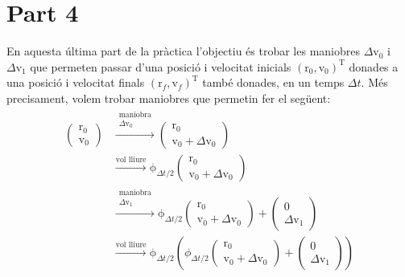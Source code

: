 \documentclass[10pt,a4paper]{article}
\newcommand{\vf}[1]{\boldsymbol{\mathrm{#1}}} %
\theoremstyle{definition}
\theoremstyle{remark}
\begin{document}
\section*{Part 4}
En aquesta última part de la pràctica l'objectiu és trobar les maniobres $\Delta \vf{v}_0$ i $\Delta \vf{v}_1$ que permeten passar d'una posició i velocitat inicials ${(\vf{r}_0,\vf{v}_0)}^\mathrm{T}$ donades a una posició i velocitat finals ${(\vf{r}_f,\vf{v}_f)}^\mathrm{T}$ també donades, en un temps $\Delta t$. Més precisament, volem trobar maniobres que permetin fer el següent:
\begin{align*}
  \begin{pmatrix}
    \vf{r}_0 \\
    \vf{v}_0
  \end{pmatrix} & \overset{\substack{\text{maniobra}   \\\Delta\vf{v}_0}}{\longrightarrow}
  \begin{pmatrix}
    \vf{r}_0 \\
    \vf{v}_0 + \Delta\vf{v}_0
  \end{pmatrix}                             \\ & \overset{\text{vol lliure}}{\longrightarrow}\vf\phi_{\Delta t/2}\begin{pmatrix}
    \vf{r}_0 \\
    \vf{v}_0 + \Delta\vf{v}_0
  \end{pmatrix}\\
                  & \overset{\substack{\text{maniobra} \\\Delta\vf{v}_1}}{\longrightarrow}
  \vf\phi_{\Delta t/2}\begin{pmatrix}
                        \vf{r}_0 \\
                        \vf{v}_0 + \Delta\vf{v}_0
                      \end{pmatrix}+\begin{pmatrix}
                                      \vf{0} \\
                                      \Delta\vf{v}_1
                                    \end{pmatrix}     \\ & \overset{\text{vol lliure}}{\longrightarrow}\vf\phi_{\Delta t/2}\left(\phi_{\Delta t/2}\begin{pmatrix}
    \vf{r}_0 \\
    \vf{v}_0 + \Delta\vf{v}_0
  \end{pmatrix}+\begin{pmatrix}
    \vf{0} \\
    \Delta\vf{v}_1
  \end{pmatrix}\right)
\end{align*}
\end{document}
